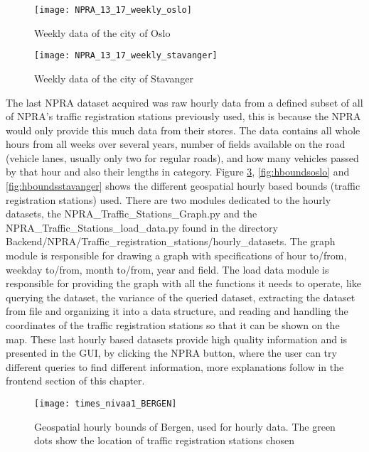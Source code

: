 \begin{figure}[!htb]
\texttt{[image: NPRA\_13\_17\_weekly\_oslo]}
\centering
\caption{Weekly data of the city of Oslo}
\label{fig:weeklyoslo}
\end{figure}

\begin{figure}[!htb]
\texttt{[image: NPRA\_13\_17\_weekly\_stavanger]}
\centering
\caption{Weekly data of the city of Stavanger}
\label{fig:weeklystavanger}
\end{figure}

\newpage

The last NPRA dataset acquired was raw hourly data from a defined subset of all of NPRA's traffic registration stations previously used, this is because the NPRA would only provide this much data from their stores. The data contains all whole hours from all weeks over several years, number of fields available on the road (vehicle lanes, usually only two for regular roads), and how many vehicles passed by that hour and also their lengths in category. Figure \ref{fig:hboundsbergen}, \ref{fig:hboundsoslo} and \ref{fig:hboundsstavanger} shows the different geospatial hourly based bounds (traffic registration stations) used. There are two modules dedicated to the hourly datasets, the NPRA\_Traffic\_Stations\_Graph.py and the NPRA\_Traffic\_Stations\_load\_data.py found in the directory \\
Backend/NPRA/Traffic\_registration\_stations/hourly\_datasets. The graph module is responsible for drawing a graph with specifications of hour to/from, weekday to/from, month to/from, year and field. The load data module is responsible for providing the graph with all the functions it needs to operate, like querying the dataset, the variance of the queried dataset, extracting the dataset from file and organizing it into a data structure, and reading and handling the coordinates of the traffic registration stations so that it can be shown on the map. These last hourly based datasets provide high quality information and is presented in the GUI, by clicking the NPRA button, where the user can try different queries to find different information, more explanations follow in the frontend section of this chapter.

\newpage

\begin{figure}[!htb]
\texttt{[image: times\_nivaa1\_BERGEN]}
\centering
\caption{Geospatial hourly bounds of Bergen, used for hourly data. The green dots show the location of traffic registration stations chosen}
\label{fig:hboundsbergen}
\end{figure}

